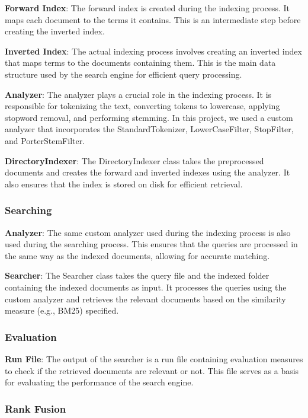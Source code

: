 \textbf{Forward Index}: The forward index is created during the indexing process. It maps each document to the terms it contains. This is an intermediate step before creating the inverted index.

\noindent  \textbf{Inverted Index}: The actual indexing process involves creating an inverted index that maps terms to the documents containing them. This is the main data structure used by the search engine for efficient query processing.

\noindent  \textbf{Analyzer}: The analyzer plays a crucial role in the indexing process. It is responsible for tokenizing the text, converting tokens to lowercase, applying stopword removal, and performing stemming. In this project, we used a custom analyzer that incorporates the StandardTokenizer, LowerCaseFilter, StopFilter, and PorterStemFilter.

\noindent \textbf{DirectoryIndexer}: The DirectoryIndexer class takes the preprocessed documents and creates the forward and inverted indexes using the analyzer. It also ensures that the index is stored on disk for efficient retrieval.

\subsubsection{Searching}

\textbf{Analyzer}: The same custom analyzer used during the indexing process is also used during the searching process. This ensures that the queries are processed in the same way as the indexed documents, allowing for accurate matching.

\noindent \textbf{Searcher}: The Searcher class takes the query file and the indexed folder containing the indexed documents as input. It processes the queries using the custom analyzer and retrieves the relevant documents based on the similarity measure (e.g., BM25) specified.

\subsubsection{Evaluation}

\noindent \textbf{Run File}: The output of the searcher is a run file containing evaluation measures to check if the retrieved documents are relevant or not. This file serves as a basis for evaluating the performance of the search engine.

\subsubsection{Rank Fusion}

